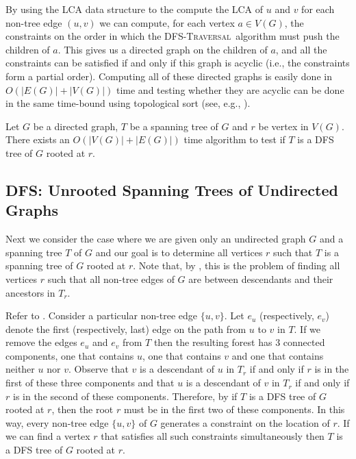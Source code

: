 \documentclass[lotsofwhite]{patmorin}
\newcommand{\dfst}{\textsc{DFS-Traversal}}
\begin{document}
By using the LCA data structure to the compute the LCA of $u$ and $v$
for each non-tree edge $(u,v)$ we can compute, for each vertex $a\in
V(G)$, the constraints on the order in which the \dfst\ algorithm must
push the children of $a$.  This gives us a directed graph on the
children of $a$, and all the constraints can be satisfied if and only
if this graph is acyclic (i.e., the constraints form a partial order).
Computing all of these directed graphs is easily done in $O(|E(G)|+|V(G)|)$
time and testing whether they are acyclic can be done in the same
time-bound using topological sort (see, e.g., \cite{X}).


\begin{thm} 
Let $G$ be a directed graph, $T$ be a spanning tree of $G$
and $r$ be vertex in $V(G)$.  There exists an $O(|V(G)|+|E(G)|)$ time algorithm
to test if $T$ is a DFS tree of $G$ rooted at $r$.
\end{thm}

\subsection{DFS: Unrooted Spanning Trees of Undirected
Graphs}

Next we consider the case where we are given only an undirected graph
$G$ and a spanning tree $T$ of $G$ and our goal is to determine all
vertices $r$ such that $T$ is a spanning tree of $G$ rooted at $r$.
Note that, by , this is the problem of finding all
vertices $r$ such that all non-tree edges of $G$ are between descendants
and their ancestors in $T_r$.

Refer to .  Consider a particular non-tree edge
$\{u,v\}$.  Let $e_u$ (respectively, $e_v$) denote the first
(respectively, last) edge on the path from $u$ to $v$ in $T$.  If we
remove the edges $e_u$ and $e_v$ from $T$ then the resulting forest
has 3 connected components, one that contains $u$, one that contains
$v$ and one that contains neither $u$ nor $v$.  Observe that $v$ is a
descendant of $u$ in $T_r$ if and only if $r$ is in the first of these
three components and that $u$ is a descendant of $v$ in $T_r$ if and
only if $r$ is in the second of these components.  Therefore, by
 if $T$ is a DFS tree of $G$ rooted at $r$, then
the root $r$ must be in the first two of these components.  In this
way, every non-tree edge $\{u,v\}$ of $G$ generates a constraint on
the location of $r$.  If we can find a vertex $r$ that satisfies all
such constraints simultaneously then $T$ is a DFS tree of $G$ rooted
at $r$.
\end{document}
